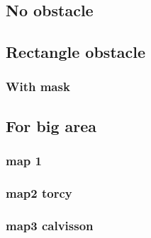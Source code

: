 	\subsection{No obstacle }
	\subsection{Rectangle obstacle}
	\subsubsection{With mask}
	\subsection{For big area}
		\subsubsection{map 1}
		\subsubsection{map2 torcy}
		\subsubsection{map3 calvisson}
		



 


